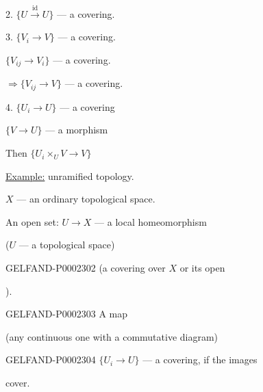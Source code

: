 2. $\{U\overset{\mathrm{id}}{\longrightarrow}U\}$ — a covering.



3. $\{V_i\to V\}$ — a covering.

$\{V_{ij}\to V_i\}$ — a covering.

$\Rightarrow\{V_{ij}\to V\}$ — a covering.



4. $\{U_i\to U\}$ — a covering

$\{V\to U\}$ — a morphism

Then $\{U_i\times_U V\to V\}$



\underline{Example:} unramified topology.

$X$ — an ordinary topological space.



An open set: $U\to X$ — a local homeomorphism

($U$ — a topological space)



\begin{GelfandAdjacentEvidence}{GELFAND-P000230}{2}
(a covering over $X$ or its open 

).
\end{GelfandAdjacentEvidence}

\begin{GelfandAdjacentEvidence}{GELFAND-P000230}{3}
A map




\end{GelfandAdjacentEvidence}

(any continuous one with a commutative diagram)



\begin{GelfandAdjacentEvidence}{GELFAND-P000230}{4}
$\{U_i\to U\}$ — a covering, if the images


cover.
\end{GelfandAdjacentEvidence}



